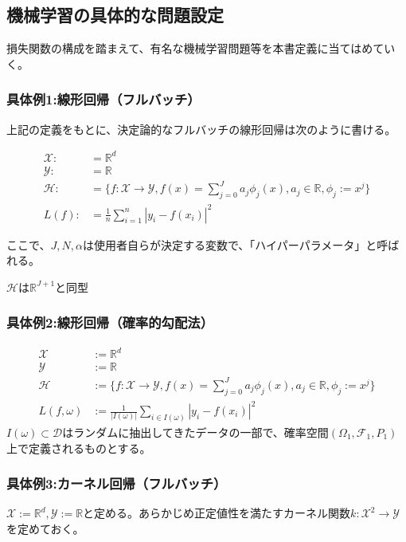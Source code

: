 \documentclass{jsarticle}
\begin{document}
\subsection{機械学習の具体的な問題設定}
損失関数の構成を踏まえて、有名な機械学習問題等を本書定義に当てはめていく。




\subsubsection{具体例1:線形回帰（フルバッチ）}

上記の定義をもとに、決定論的なフルバッチの線形回帰は次のように書ける。

\begin{align}
\mathcal{X}:&=\mathbb{R}^d\\
\mathcal{Y}:&=\mathbb{R}\\
\mathcal{H}:&=\{f:\mathcal{X}\to\mathcal{Y},f(x)=\sum^J_{j=0}a_j\phi_j(x),a_j\in\mathbb{R},\phi_j:=x^j\}\\
L(f):&=\frac{1}{n}\sum^n_{i=1}|y_i-f(x_i)|^2
\end{align}

ここで、$J,N,\alpha$は使用者自らが決定する変数で、「ハイパーパラメータ」と呼ばれる。

$\mathcal{H}$は$\mathbb{R}^{J+1}$と同型

\subsubsection{具体例2:線形回帰（確率的勾配法）}
\begin{align}
\mathcal{X}&:=\mathbb{R}^d\\
\mathcal{Y}&:=\mathbb{R}\\
\mathcal{H}&:=\{f:\mathcal{X}\to\mathcal{Y},f(x)=\sum^J_{j=0}a_j\phi_j(x),a_j\in\mathbb{R},\phi_j:=x^j\}\\
L(f,\omega)&:=\frac{1}{|I(\omega)|}\sum_{i\in I(\omega)}|y_i-f(x_i)|^2
\end{align}
$I(\omega)\subset \mathcal{D}$はランダムに抽出してきたデータの一部で、確率空間$(\Omega_1,\mathcal{F}_1,P_1)$上で定義されるものとする。

\subsubsection{具体例3:カーネル回帰（フルバッチ）}
$\mathcal{X}:=\mathbb{R}^d,\mathcal{Y}:=\mathbb{R}$と定める。あらかじめ正定値性を満たすカーネル関数$k:\mathcal{X}^2\to\mathcal{Y}$を定めておく。
\end{document}
